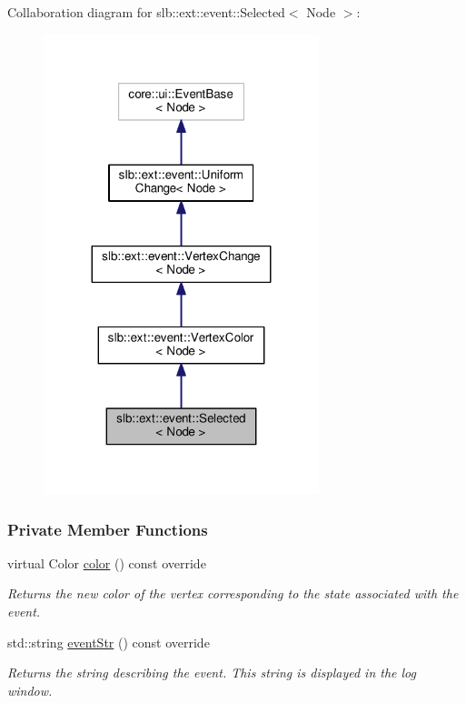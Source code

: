 Collaboration diagram for slb\+:\+:ext\+:\+:event\+:\+:Selected$<$ Node $>$\+:\nopagebreak
\begin{figure}[H]
\begin{center}
\leavevmode
\includegraphics[width=227pt]{structslb_1_1ext_1_1event_1_1Selected__coll__graph}
\end{center}
\end{figure}
\subsubsection*{Private Member Functions}
\begin{DoxyCompactItemize}
\item 
virtual Color \hyperlink{structslb_1_1ext_1_1event_1_1Selected_aa00ff31fafc8dc707c316d46fbdd3b39}{color} () const override
\begin{DoxyCompactList}\small\item\em Returns the new color of the vertex corresponding to the state associated with the event. \end{DoxyCompactList}\item 
std\+::string \hyperlink{structslb_1_1ext_1_1event_1_1Selected_aeb255a4a3d3321d11b65fe555def2c1d}{event\+Str} () const override
\begin{DoxyCompactList}\small\item\em Returns the string describing the event. This string is displayed in the log window. \end{DoxyCompactList}\end{DoxyCompactItemize}
